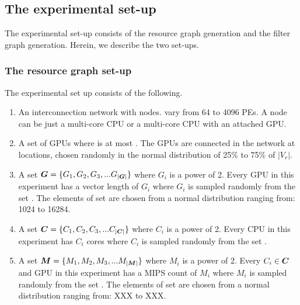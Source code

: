 \subsection{The experimental set-up}
\label{sec:experimental-setup}

The experimental set-up consists of the resource graph generation and the
filter graph generation. Herein, we describe the two set-ups.

\subsubsection{The resource graph set-up}
\label{sec:resource-graph-setup}

The experimental set up consists of the following.

\begin{enumerate}

\item An interconnection network with \numtplgynodes
  nodes. \numtplgynodes vary from 64 to 4096 PEs. A node can be just a
  multi-core CPU or a multi-core CPU with an attached GPU.

\item A set of \gpunum GPUs where \gpunum is at most \numtplgynodes. The
  GPUs are connected in the network at locations, chosen randomly in the
  normal distribution of 25\% to 75\% of $|V_r|$.

\item A set $\bm{G} = \{G_1, G_2, G_3, ... G_{|\bm{G}|}\}$ where
  $G_i$ is a power of 2.  Every GPU in this experiment has a vector
  length of $G_i$ where $G_i$ is sampled randomly from the set
  \veclenset. The elements of set \veclenset are chosen from a normal
  distribution ranging from: 1024 to 16284.

\item A set $\bm{C} = \{C_1, C_2, C_3, ... C_{|\bm{C}|}\}$
  where $C_i$ is a power of 2.  Every CPU in this experiment has $C_i$
  cores where $C_i$ is sampled randomly from the set \corenumset.

\item A set $\bm{M} = \{M_1, M_2, M_3, ... M_{|\bm{M}|}\}$ where
  $M_i$ is a power of 2.  Every $C_i \in \bm{C}$ and GPU in this
  experiment has a MIPS count of $M_i$ where $M_i$ is sampled randomly
  from the set \mipsset. The elements of set \mipsset are chosen from a
  normal distribution ranging from: XXX to XXX.

\end{enumerate}

